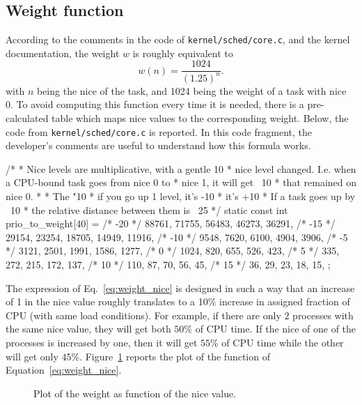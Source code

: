 \subsection{Weight function}
According to the comments in the code of \verb|kernel/sched/core.c|, and the kernel documentation, the weight $w$ is roughly equivalent to
\begin{equation}
  w(n) = \dfrac{1024}{(1.25)^{n}}.
  \label{eq:weight_nice}
\end{equation}
with $n$ being the nice of the task, and 1024 being the weight of a task with nice 0. To avoid computing this function every time it is needed, there is a pre-calculated table which maps nice
values to the corresponding weight. Below, the code from
\verb|kernel/sched/core.c| is reported. In this code fragment, the developer's comments are useful
to understand how this formula works.
\begin{code}
/*
 * Nice levels are multiplicative, with a gentle 10%
 * nice level changed. I.e. when a CPU-bound task goes from nice 0 to
 * nice 1, it will get ~10%
 * that remained on nice 0.
 *
 * The "10%
 * if you go up 1 level, it's -10%
 * it's +10%
 * If a task goes up by ~10%
 * the relative distance between them is ~25%
 */
static const int prio_to_weight[40] = {
/* -20 */ 88761, 71755, 56483, 46273, 36291,
/* -15 */ 29154, 23254, 18705, 14949, 11916,
/* -10 */ 9548, 7620, 6100, 4904, 3906,
/* -5 */ 3121, 2501, 1991, 1586, 1277,
/* 0 */ 1024, 820, 655, 526, 423,
/* 5 */ 335, 272, 215, 172, 137,
/* 10 */ 110, 87, 70, 56, 45,
/* 15 */ 36, 29, 23, 18, 15,
};
\end{code}
The expression of Eq.~\eqref{eq:weight_nice} is designed in such a way that an increase of 1 in the nice value roughly translates to a 10\% increase in assigned fraction of CPU (with same load conditions). %
For example, if there are only 2 processes with the same nice value, they will get both $50\%$ of CPU time. If the nice of one of the processes is increased by one, then it will get $55\%$ of CPU time while the other will get only $45\%$.
Figure~\ref{fig:weight_vs_nice} reports the plot of the function of Equation~\eqref{eq:weight_nice}.
\begin{figure}[htb]
\label{fig:weight_vs_nice}
\caption{Plot of the weight as function of the nice value.}
\end{figure}
